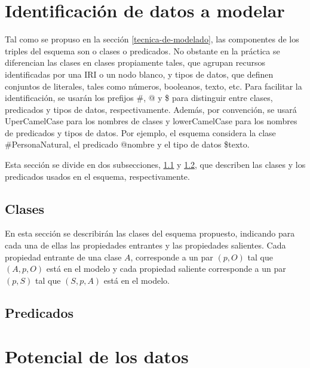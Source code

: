 \documentclass[letterpaper,titlepage]{article}
\begin{document}
\section{Identificación de datos a modelar}

Tal como se propuso en la sección \ref{tecnica-de-modelado}, las
componentes de los triples del esquema son o clases o predicados. No
obstante en la práctica se diferencian las clases en clases
propiamente tales, que agrupan recursos identificadas por una IRI o un
nodo blanco, y tipos de datos, que definen conjuntos de literales,
tales como números, booleanos, texto, etc. Para facilitar la
identificación, se usarán los prefijos \#, @ y \$ para distinguir
entre clases, predicados y tipos de datos, respectivamente. Además,
por convención, se usará UperCamelCase para los nombres de clases y
lowerCamelCase para los nombres de predicados y tipos de datos. Por
ejemplo, el esquema considera la clase \#PersonaNatural, el predicado
@nombre y el tipo de datos \$texto.

Esta sección se divide en dos subsecciones, \ref{clases} y
\ref{predicados}, que describen las clases y los predicados usados en
el esquema, respectivamente.

\subsection{Clases}
\label{clases}

En esta sección se describirán las clases del esquema
propuesto, indicando para cada una de ellas las propiedades entrantes
y las propiedades salientes. Cada propiedad entrante de una clase $A$,
corresponde a un par $(p,O)$ tal que $(A,p,O)$ está en el modelo y
cada propiedad saliente corresponde a un par $(p,S)$ tal que $(S,p,A)$
está en el modelo.



\subsection{Predicados}
\label{predicados}



\section{Potencial de los datos}
\end{document}
